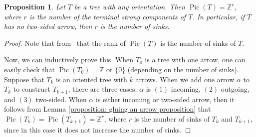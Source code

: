 \documentclass[11pt,reqno]{amsart}
\DeclareMathOperator{\Pic}{Pic}
\theoremstyle{definition}
\theoremstyle{plain}
\newtheorem{pro}[mydef]{\textbf{Proposition}}
\begin{document}
\begin{pro}
		Let $T$ be a tree with any orientation. Then $\Pic(T)=\mathbb{Z}^r$, where $r$ is the number of the terminal strong components of $T$. In particular, if $T$ has no two-sided arrow, then $r$ is the number of sinks.
	\end{pro}
\begin{proof}
Note that from~\cite[Corollary 3.5]{wagner2000critical} that the rank of $\Pic(T)$ is the number of sinks of $T$.

Now, we can inductively prove this. When $T_0$ is a tree with one arrow, one can easily check that $\Pic(T_0) =\mathbb{Z}$ or $\{0\}$ (depending on the number of sinks). Suppose that $T_k$ is an oriented tree with $k$ arrows. When we add one arrow $\alpha$ to $T_k$ to construct $T_{k+1}$, there are three cases; $\alpha$ is $(1)$ incoming, $(2)$ outgoing, and $(3)$ two-sided. When $\alpha$ is either incoming or two-sided arrow, then it follows from Lemma \ref{proposition: gluing an arrow proposition} that $\Pic(T_k)=\Pic(T_{k+1})=\mathbb{Z}^r$, where $r$ is the number of sinks of $T_k$ and $T_{k+1}$, since in this case it does not increase the number of sinks.


\end{proof}
\end{document}
